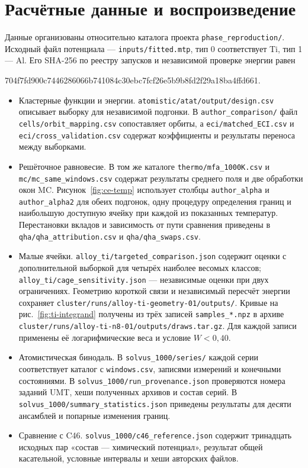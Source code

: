 \section*{Расчётные данные и воспроизведение}
\label{sec:archive}
Данные организованы относительно каталога проекта
\nolinkurl{phase_reproduction/}. Исходный файл потенциала —
\nolinkurl{inputs/fitted.mtp}, тип 0 соответствует Ti, тип 1 — Al.
Его SHA-256 по реестру запусков и независимой проверке энергии равен
\begin{center}
{\small\ttfamily 704f7fd900c7446286066b741084c30ebc7fcf26e5b9b8fd2f29a18ba4ffd661}.
\end{center}
\begin{itemize}
\item Кластерные функции и энергии. \nolinkurl{atomistic/atat/output/design.csv}
описывает выборку для независимой подгонки. В \nolinkurl{author_comparison/}
файл \nolinkurl{cells/orbit_mapping.csv} сопоставляет орбиты, а
\nolinkurl{eci/matched_ECI.csv} и \nolinkurl{eci/cross_validation.csv}
содержат коэффициенты и результаты переноса между выборками.
\item Решёточное равновесие. В том же каталоге
\nolinkurl{thermo/mfa_1000K.csv} и \nolinkurl{mc/mc_same_windows.csv}
содержат результаты среднего поля и две обработки окон MC.
Рисунок~\ref{fig:ce-temp} использует столбцы
\texttt{author\_alpha} и \texttt{author\_alpha2} для обеих подгонок,
одну процедуру определения границ и наибольшую доступную ячейку
при каждой из показанных температур. Перестановки вкладов и зависимость
от пути сравнения приведены в \nolinkurl{qha/qha_attribution.csv}
и \nolinkurl{qha/qha_swaps.csv}.
\item Малые ячейки. \nolinkurl{alloy_ti/targeted_comparison.json} содержит
оценки с дополнительной выборкой для четырёх наиболее весомых классов;
\nolinkurl{alloy_ti/cage_sensitivity.json} — независимые оценки при двух
ограничениях. Геометрию короткой связи и независимый пересчёт энергии
сохраняет \nolinkurl{cluster/runs/alloy-ti-geometry-01/outputs/}.
Кривые на рис.~\ref{fig:ti-integrand} получены из трёх записей
\texttt{samples\_*.npz} в архиве
\nolinkurl{cluster/runs/alloy-ti-n8-01/outputs/draws.tar.gz}.
Для каждой записи применены её логарифмические веса и условие \(W<0{,}40\).
\item Атомистическая бинодаль. В \nolinkurl{solvus_1000/series/} каждой
серии соответствует каталог с \texttt{windows.csv}, записями измерений и
конечными состояниями. В \nolinkurl{solvus_1000/run_provenance.json}
проверяются номера заданий UMT, хеши полученных архивов и состав серий.
В \nolinkurl{solvus_1000/summary_statistics.json} приведены результаты
для десяти ансамблей и попарные изменения границ.
\item Сравнение с C46. \nolinkurl{solvus_1000/c46_reference.json}
содержит тринадцать исходных пар «состав — химический потенциал»,
результат общей касательной, условные интервалы и хеши авторских файлов.
\end{itemize}

